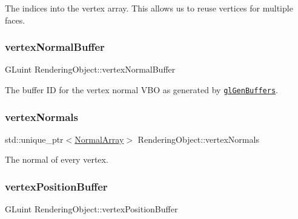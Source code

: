 The indices into the vertex array. This allows us to reuse vertices for multiple faces. 

\hypertarget{class_rendering_object_a91649e3a653f2266cd00c718f10849f9}{}\label{class_rendering_object_a91649e3a653f2266cd00c718f10849f9} 
\subsubsection{\texorpdfstring{vertex\+Normal\+Buffer}{vertexNormalBuffer}}
{\footnotesize\ttfamily G\+Luint Rendering\+Object\+::vertex\+Normal\+Buffer\hspace{0.3cm}{\ttfamily [protected]}}



The buffer ID for the vertex normal V\+BO as generated by \href{https://www.opengl.org/sdk/docs/man/html/glGenBuffers.xhtml}{\tt gl\+Gen\+Buffers}. 

\hypertarget{class_rendering_object_ac28d301f97d29ab603f65f8e823063b4}{}\label{class_rendering_object_ac28d301f97d29ab603f65f8e823063b4} 
\subsubsection{\texorpdfstring{vertex\+Normals}{vertexNormals}}
{\footnotesize\ttfamily std\+::unique\+\_\+ptr$<$\hyperlink{class_rendering_object_a327c4d892de8d6138fb59afa6d078257}{Normal\+Array}$>$ Rendering\+Object\+::vertex\+Normals\hspace{0.3cm}{\ttfamily [protected]}}



The normal of every vertex. 

\hypertarget{class_rendering_object_a473f623b39157288bef992e76ddc45a9}{}\label{class_rendering_object_a473f623b39157288bef992e76ddc45a9} 
\subsubsection{\texorpdfstring{vertex\+Position\+Buffer}{vertexPositionBuffer}}
{\footnotesize\ttfamily G\+Luint Rendering\+Object\+::vertex\+Position\+Buffer\hspace{0.3cm}{\ttfamily [protected]}}



